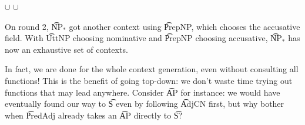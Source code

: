 \begin{EmptyItem}
\begin{HighlightingFancy}[]
    \OtherTok{::=} 
  \OtherTok{::=}   \NormalTok{\}} $\cup$
              \NormalTok{\}}
   \OtherTok{::=}   \NormalTok{\}}
  \OtherTok{::=}   \NormalTok{\}}
   \OtherTok{::=}   \NormalTok{\}} $\cup$
              \NormalTok{\}}
 \OtherTok{::=}   \NormalTok{\}}
 \OtherTok{::=}   \NormalTok{\}}
 \OtherTok{::=}   \NormalTok{\}}
\end{HighlightingFancy}
\end{EmptyItem}

\noindent On round 2, \t{NP$_*$} got another context using
\t{PrepNP}, which chooses the accusative field. With \t{UttNP}
choosing nominative and \t{PrepNP} choosing accusative, \t{NP$_*$} has
now an exhaustive set of contexts.

In fact, we are done for the whole context generation, even without consulting all functions!
This is the benefit of going top-down: we don’t waste time trying out
functions that may lead anywhere. Consider \t{AP} for instance: we
would have eventually found our way to \t{S} even by following \t{AdjCN} first, but
why bother when \t{PredAdj} already takes an \t{AP} directly to \t{S}?

